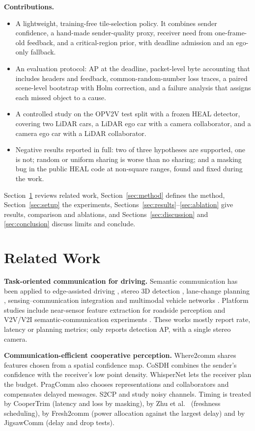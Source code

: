 \documentclass[conference]{IEEEtran}
\begin{document}
\textbf{Contributions.}
\begin{itemize}
\item A lightweight, training-free tile-selection policy. It combines sender confidence, a hand-made sender-quality proxy, receiver need from one-frame-old feedback, and a critical-region prior, with deadline admission and an ego-only fallback.
\item An evaluation protocol: AP at the deadline, packet-level byte accounting that includes headers and feedback, common-random-number loss traces, a paired scene-level bootstrap with Holm correction, and a failure analysis that assigns each missed object to a cause.
\item A controlled study on the OPV2V test split with a frozen HEAL detector, covering two LiDAR cars, a LiDAR ego car with a camera collaborator, and a camera ego car with a LiDAR collaborator.
\item Negative results reported in full: two of three hypotheses are supported, one is not; random or uniform sharing is worse than no sharing; and a masking bug in the public HEAL code at non-square ranges, found and fixed during the work.
\end{itemize}
Section~\ref{sec:related} reviews related work, Section~\ref{sec:method} defines the method, Section~\ref{sec:setup} the experiments, Sections~\ref{sec:results}--\ref{sec:ablation} give results, comparison and ablations, and Sections~\ref{sec:discussion} and \ref{sec:conclusion} discuss limits and conclude.

\section{Related Work}\label{sec:related}
\textbf{Task-oriented communication for driving.} Semantic communication has been applied to edge-assisted driving \cite{feng2025}, stereo 3D detection \cite{cao2025}, lane-change planning \cite{zhang2026lane}, sensing--communication integration \cite{yang2025} and multimodal vehicle networks \cite{du2025}. Platform studies include near-sensor feature extraction for roadside perception \cite{zhang2025near} and V2V/V2I semantic-communication experiments \cite{li2025}. These works mostly report rate, latency or planning metrics; only \cite{cao2025} reports detection AP, with a single stereo camera.

\textbf{Communication-\allowbreak efficient cooperative perception.} Where2comm \cite{hu2022where2comm} shares features chosen from a spatial confidence map. CoSDH \cite{xu2025cosdh} combines the sender's confidence with the receiver's low point density. WhisperNet \cite{chen2026whisper} lets the receiver plan the budget. PragComm \cite{hu2026prag} also chooses representations and collaborators and compensates delayed messages. S2CP \cite{liu2025} and \cite{sheng2026} study noisy channels. Timing is treated by CooperTrim \cite{mukhopadhyay2026} (latency and loss by masking), by Zhu et al.\ \cite{zhu2026} (freshness scheduling), by Fresh2comm \cite{wu2025fresh} (power allocation against the largest delay) and by JigsawComm \cite{wang2025jigsaw} (delay and drop tests).
\end{document}
